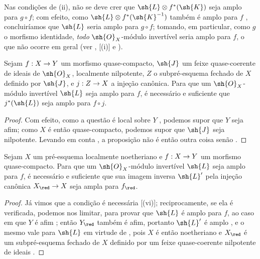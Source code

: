\documentclass[oneside,10pt]{amsart}
\makeatletter
\newcommand{\ega@arrow}[2]{\mathchoice{#1}{#2}{#2}{#2}}
\renewcommand{\to}{\ega@arrow{\longrightarrow}{\rightarrow}}
\let\EGAOriginalLabel\label
\renewcommand{\label}[1]{\phantomsection\EGAOriginalLabel{#1}}
\makeatother
\begin{document}
\begin{remark}[4.6.14]
\label{II.4.6.14}
Nas condições de (ii), não se deve crer que $\sh{L}\otimes f^*(\sh{K})$ seja amplo para $g\circ f$;
com efeito, como $\sh{L}\otimes f^*(\sh{K}^{-1})$ também é amplo para $f$ , concluiríamos que $\sh{L}$ seria amplo para $g\circ f$;
tomando, em particular, como $g$ o morfismo identidade, \emph{todo} $\sh{O}_X$-módulo invertível seria amplo para $f$, o que não ocorre em geral (ver , [(i)] e ).
\end{remark}

\begin{proposition}[4.6.15]
\label{II.4.6.15}
Sejam $f:X\to Y$ um morfismo quase-compacto, $\sh{J}$ um feixe quase-coerente de ideais de $\sh{O}_X$, localmente nilpotente, $Z$ o subpré-esquema fechado de $X$ definido por $\sh{J}$, e $j:Z\to X$ a injeção canônica.
Para que um $\sh{O}_X$-módulo invertível $\sh{L}$ seja amplo para $f$, é necessário e suficiente que $j^*(\sh{L})$ seja amplo para $f\circ j$.
\end{proposition}

\begin{proof}
Com efeito, como a questão é local sobre $Y$ , podemos supor que $Y$ seja afim;
como $X$ é então quase-compacto, podemos supor que $\sh{J}$ seja nilpotente.
Levando em conta , a proposição não é então outra coisa senão .
\end{proof}

\begin{corollary}[4.6.16]
\label{II.4.6.16}
Sejam $X$ um pré-esquema localmente noetheriano e $f:X\to Y$ um morfismo quase-compacto.
Para que um $\sh{O}_X$-módulo invertível $\sh{L}$ seja amplo para $f$, é necessário e suficiente que sua imagem inversa $\sh{L}'$ pela injeção canônica $X_\red\to X$ seja ampla para $f_\red$.
\end{corollary}

\begin{proof}
Já vimos que a condição é necessária [(vi)];
reciprocamente, se ela é verificada, podemos nos limitar, para provar que $\sh{L}$ é amplo para $f$, ao caso em que $Y$ é afim ;
então $Y_\red$ também é afim, portanto $\sh{L}'$ é amplo , e o mesmo vale para $\sh{L}$ em virtude de , pois $X$ é então noetheriano e $X_\red$ é um subpré-esquema fechado de $X$ definido por um feixe quase-coerente nilpotente de ideais .
\end{proof}
\end{document}
